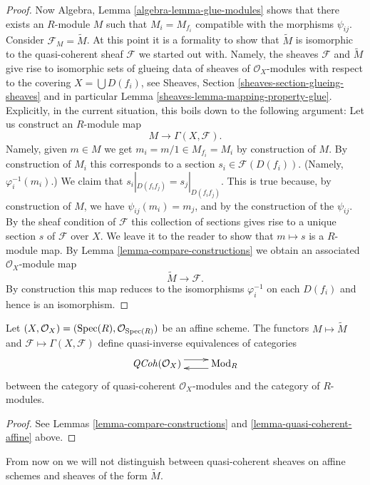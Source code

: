 \begin{proof}
\medskip\noindent
Now Algebra, Lemma \ref{algebra-lemma-glue-modules}
shows that there exists an $R$-module $M$ such that
$M_i = M_{f_i}$ compatible with the morphisms $\psi_{ij}$.
Consider $\mathcal{F}_M = \widetilde M$. At this point it is
a formality to show that $\widetilde M$ is isomorphic to
the quasi-coherent sheaf $\mathcal{F}$ we started out with.
Namely, the sheaves $\mathcal{F}$ and $\widetilde M$ give
rise to isomorphic sets of glueing data of sheaves of $\mathcal{O}_X$-modules
with respect to the covering $X = \bigcup D(f_i)$, see
Sheaves, Section \ref{sheaves-section-glueing-sheaves}
and in particular Lemma \ref{sheaves-lemma-mapping-property-glue}.
Explicitly, in the current situation, this boils down to
the following argument: Let us construct an $R$-module map
$$
M \longrightarrow \Gamma(X, \mathcal{F}).
$$
Namely, given $m \in M$ we get $m_i = m/1 \in M_{f_i} = M_i$
by construction of $M$. By construction of $M_i$ this corresponds
to a section $s_i \in \mathcal{F}(D(f_i))$. (Namely, $\varphi^{-1}_i(m_i)$.)
We claim that $s_i|_{D(f_if_j)} = s_j|_{D(f_if_j)}$. This is
true because, by construction of $M$, we have $\psi_{ij}(m_i) = m_j$,
and by the construction of the $\psi_{ij}$. By the sheaf condition of
$\mathcal{F}$ this collection of sections gives rise to a unique
section $s$ of $\mathcal{F}$ over $X$. We leave it to the reader
to show that $m \mapsto s$ is a $R$-module map.
By Lemma \ref{lemma-compare-constructions} we obtain an associated
$\mathcal{O}_X$-module map
$$
\widetilde M \longrightarrow \mathcal{F}.
$$
By construction this map reduces to the isomorphisms
$\varphi_i^{-1}$ on each $D(f_i)$ and hence is an isomorphism.
\end{proof}

\begin{lemma}
\label{lemma-equivalence-quasi-coherent}
Let $(X, \mathcal{O}_X) = (\mathop{\mathrm{Spec}}(R), \mathcal{O}_{\mathop{\mathrm{Spec}}(R)})$
be an affine scheme.
The functors $M \mapsto \widetilde M$ and
$\mathcal{F} \mapsto \Gamma(X, \mathcal{F})$ define quasi-inverse
equivalences of categories
$$
\xymatrix{
\QCoh(\mathcal{O}_X)
\ar@<1ex>[r]
&
\text{Mod}_R
\ar@<1ex>[l]
}
$$
between the category of quasi-coherent $\mathcal{O}_X$-modules
and the category of $R$-modules.
\end{lemma}

\begin{proof}
See Lemmas \ref{lemma-compare-constructions}
and \ref{lemma-quasi-coherent-affine} above.
\end{proof}

\noindent
From now on we will not distinguish between quasi-coherent
sheaves on affine schemes and sheaves of the form $\widetilde M$.

